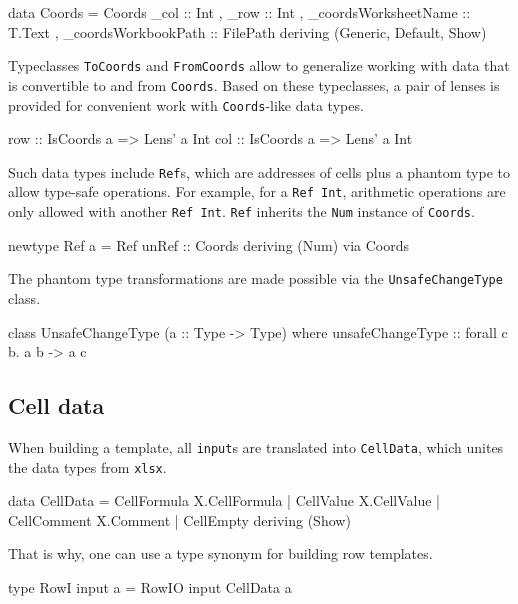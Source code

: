 \begin{mycode}
data Coords = Coords
  { _col :: Int
  , _row :: Int
  , _coordsWorksheetName :: T.Text
  , _coordsWorkbookPath :: FilePath
  }
  deriving (Generic, Default, Show)
\end{mycode}

Typeclasses \texttt{ToCoords} and \texttt{FromCoords} allow to generalize working with data that is convertible to and from \texttt{Coords}. Based on these typeclasses, a pair of lenses is provided for convenient work with \texttt{Coords}-like data types.

\begin{mycode}
row :: IsCoords a => Lens' a Int
col :: IsCoords a => Lens' a Int
\end{mycode}

Such data types include \texttt{Ref}s, which are addresses of cells plus a phantom type to allow type-safe operations. For example, for a \texttt{Ref Int}, arithmetic operations are only allowed with another \texttt{Ref Int}. \texttt{Ref} inherits the \texttt{Num} instance of \texttt{Coords}.

\begin{mycode}
newtype Ref a = Ref {unRef :: Coords}
  deriving (Num) via Coords
\end{mycode}

The phantom type transformations are made possible via the \texttt{UnsafeChangeType} class.

\begin{mycode}
class UnsafeChangeType (a :: Type -> Type) where
  unsafeChangeType :: forall c b. a b -> a c
\end{mycode}

\subsection{Cell data}
\label{sec:celldata}

When building a template, all \texttt{input}s are translated into \texttt{CellData}, which unites the data types from \texttt{xlsx}.

\begin{mycode}
data CellData
  = CellFormula X.CellFormula
  | CellValue X.CellValue
  | CellComment X.Comment
  | CellEmpty
  deriving (Show)
\end{mycode}

That is why, one can use a type synonym for building row templates.

\begin{mycode}
type RowI input a = RowIO input CellData a
\end{mycode}

